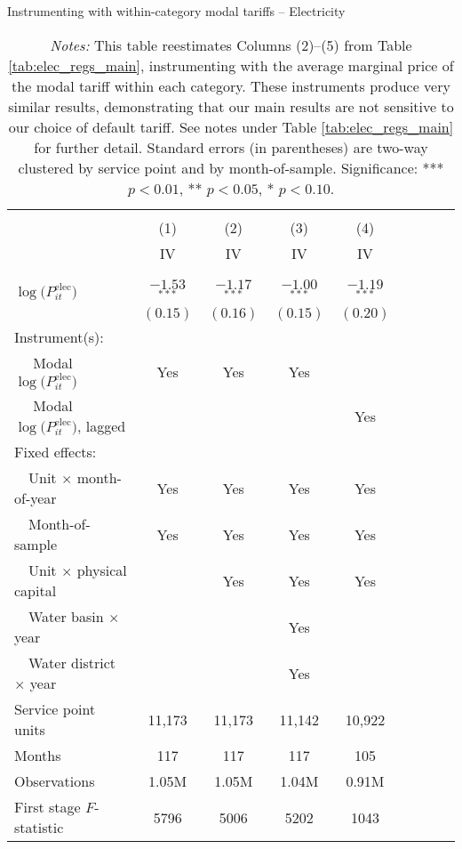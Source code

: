 \begin{table}[t!]\centering
\small
\caption{Instrumenting with within-category modal tariffs -- Electricity  \label{tab:elec_regs_modal_tariff}}
\vspace{-0.1cm}
\small
\begin{adjustbox}{center} 
\begin{tabular}{lcccccccc} 
\hline \hline
\vspace{-0.37cm}
\\
 & (1)  & (2)  & (3) & (4)  \\ 
[0.1em]
 & IV & IV & IV & IV \\
\vspace{-0.37cm}
\\
\cline{2-5}
\vspace{-0.27cm}
\\
 $\log\big(P^{\text{elec}}_{it}\big)$ ~ & $-1.53$$^{***}$  & $-1.17$$^{***}$ & $-1.00$$^{***}$ & $-1.19$$^{***}$  \\ 
& $(0.15)$ & $(0.16)$ & $(0.15)$ & $(0.20)$ \\
[1.5em] 
Instrument(s): \\
[0.1em] 
~~ Modal $\log\big(P^{\text{elec}}_{it}\big)$  & Yes & Yes & Yes  & \\
[0.1em] 
~~ Modal $\log\big(P^{\text{elec}}_{it}\big)$, lagged  & & & & Yes \\
[1em] 
Fixed effects: \\
[0.1em] 
~~Unit $\times$ month-of-year  & Yes  & Yes  & Yes  & Yes  \\ 
[0.1em] 
~~Month-of-sample  & Yes  & Yes  & Yes  & Yes    \\ 
[0.1em] 
~~Unit $\times$ physical capital & & Yes & Yes & Yes  \\
[0.1em] 
~~Water basin $\times$ year & & & Yes &  \\
[0.1em] 
~~Water district $\times$ year & & & Yes &  \\
[1em] 
Service point units & 11,173 & 11,173 & 11,142 & 10,922    \\ 
[0.1em] 
Months  & 117 & 117 & 117 & 105 \\ 
[0.1em] 
Observations & 1.05M & 1.05M & 1.04M & 0.91M    \\ 
[0.1em] 
First stage $F$-statistic & 5796 & 5006 & 5202 & 1043   \\ 
[0.15em]
\hline
\end{tabular}
\end{adjustbox}
\captionsetup{width=\textwidth}
\caption*{\scriptsize \emph{Notes:} This table reestimates Columns (2)--(5) from Table \ref{tab:elec_regs_main}, 
instrumenting with the average marginal price of the modal tariff within each category. 
These instruments produce very similar results, demonstrating that our main results are not sensitive to our choice of default tariff. 
See notes under Table \ref{tab:elec_regs_main} for further detail. 
Standard errors (in parentheses) are two-way clustered by service point and by month-of-sample.
Significance: *** $p < 0.01$, ** $p < 0.05$, * $p < 0.10$.
}
\end{table}
